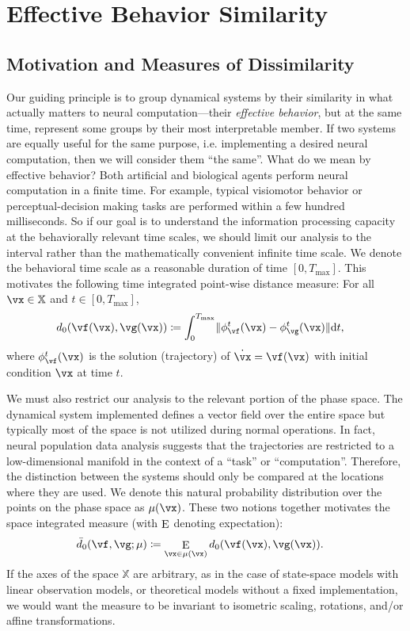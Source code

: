 \documentclass{article}
\theoremstyle{definition} \newtheorem{definition}{Definition}  \newtheorem{example}{Example}
\theoremstyle{remark} \newtheorem{remark}{Remark}
\newcounter{ct}
\DeclarePairedDelimiter{\norm}{\lVert}{\rVert}
\DeclareMathOperator*{\E}{\rm E} %
\newcommand{\dm}[1]{\ensuremath{\mathrm{d}{#1}}} %
\newcommand{\inputSpace}{\mathbb{X}}
\newcommand{\initDist}{\mu} %
\begin{document}
\section{Effective Behavior Similarity}\label{sec:effective_ds}
\subsection{Motivation and Measures of Dissimilarity}
Our guiding principle is to group dynamical systems by their similarity in what actually matters to neural computation---their \emph{effective behavior}, but at the same time, represent some groups by their most interpretable member.
If two systems are equally useful for the same purpose, i.e. implementing a desired neural computation, then we will consider them ``the same''.
What do we mean by effective behavior?
Both artificial and biological agents perform neural computation in a finite time.
For example, typical visiomotor behavior or perceptual-decision making tasks are performed within a few hundred milliseconds.
So if our goal is to understand the information processing capacity at the behaviorally relevant time scales, we should limit our analysis to the interval rather than the mathematically convenient infinite time scale.
We denote the behavioral time scale as a reasonable duration of time $[0, T_\text{max}]$.
%
This motivates the following time integrated point-wise distance measure:
For all $\vx \in \inputSpace$ and $t \in [0, T_\text{max}]$,
\begin{align}
    d_0(\vf(\vx), \vg(\vx))
	&\coloneq \int_0^{T_{\text{max}}} \norm{\phi_\vf^t(\vx) - \phi_\vg^t(\vx)} \dm{t},
\end{align}
where $\phi_\vf^t(\vx)$ is the solution (trajectory) of $\dot\vx = \vf(\vx)$ with initial condition $\vx$ at time $t$.

We must also restrict our analysis to the relevant portion of the phase space.
The dynamical system implemented defines a vector field over the entire space but typically most of the space is not utilized during normal operations.
In fact, neural population data analysis suggests that the trajectories are restricted to a low-dimensional manifold in the context of a ``task'' or  ``computation''.
Therefore, the distinction between the systems should only be compared at the locations where they are used.
We denote this natural probability distribution over the points on the phase space as $\initDist(\vx)$.
%
These two notions together motivates the space integrated measure (with $\E$ denoting expectation):
\begin{align}
    \bar{d}_{0}(\vf, \vg; \initDist)
	&\coloneq
	    \E_{\vx \in \initDist(\vx)}
		d_0(\vf(\vx), \vg(\vx)).
	\label{eq:ed0}
\end{align}
%
If the axes of the space $\inputSpace$ are arbitrary, as in the case of state-space models with linear observation models, or theoretical models without a fixed implementation, we would want the measure to be invariant to isometric scaling, rotations, and/or affine transformations.
\end{document}
